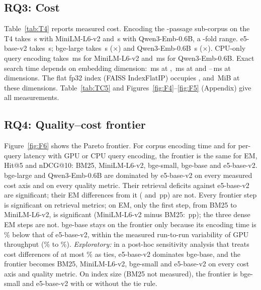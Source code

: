 \subsection{RQ3: Cost}
\label{sec:rq3}

Table~\ref{tab:T4} reports measured cost.
Encoding the -passage sub-corpus on the T4 takes \,s with MiniLM-L6-v2 and \,s with Qwen3-Emb-0.6B, a -fold range.
e5-base-v2 takes \,s; bge-large takes \,s ($\times$) and Qwen3-Emb-0.6B \,s ($\times$).
CPU-only query encoding takes \,ms for MiniLM-L6-v2 and \,ms for Qwen3-Emb-0.6B.
Exact search time depends on embedding dimension: \,ms at , \,ms at  and --\,ms at  dimensions.
The flat fp32 index (FAISS IndexFlatIP) occupies ,  and \,MiB at these dimensions.
Table~\ref{tab:TC5} and Figures~\ref{fig:F4}--\ref{fig:F5} (Appendix) give all measurements.

\subsection{RQ4: Quality--cost frontier}
\label{sec:rq4}
\figsix
Figure~\ref{fig:F6} shows the Pareto frontier.
For corpus encoding time and for per-query latency with GPU or CPU query encoding, the frontier is the same for EM, Hit@5 and nDCG@10: BM25, MiniLM-L6-v2, bge-small, bge-base and e5-base-v2.
bge-large and Qwen3-Emb-0.6B are dominated by e5-base-v2 on every measured cost axis and on every quality metric.
Their retrieval deficits against e5-base-v2 are significant; their EM differences from it ( and \,pp) are not.
Every frontier step is significant on retrieval metrics; on EM, only the first step, from BM25 to MiniLM-L6-v2, is significant (MiniLM-L6-v2 minus BM25: \,pp); the three dense EM steps are not.
bge-base stays on the frontier only because its encoding time is \% below that of e5-base-v2, within the measured run-to-run variability of GPU throughput (\% to \%).
\emph{Exploratory:} in a post-hoc sensitivity analysis that treats cost differences of at most \% as ties, e5-base-v2 dominates bge-base, and the frontier becomes BM25, MiniLM-L6-v2, bge-small and e5-base-v2 on every cost axis and quality metric.
On index size (BM25 not measured), the frontier is bge-small and e5-base-v2 with or without the tie rule.

